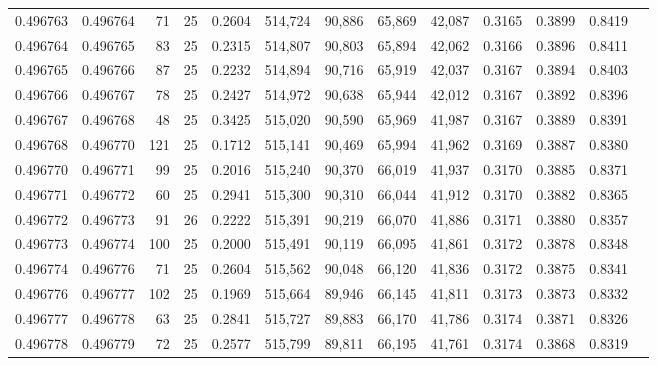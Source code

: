\begin{tabular}{rrrrrrrrrrrrr}
0.496763 & 0.496764 &    71 &  25 &                                     0.2604 & 514,724 &  90,886 &  65,869 &  42,087 & 0.3165 & 0.3899 & 0.8419 \\
0.496764 & 0.496765 &    83 &  25 &                                     0.2315 & 514,807 &  90,803 &  65,894 &  42,062 & 0.3166 & 0.3896 & 0.8411 \\
0.496765 & 0.496766 &    87 &  25 &                                     0.2232 & 514,894 &  90,716 &  65,919 &  42,037 & 0.3167 & 0.3894 & 0.8403 \\
0.496766 & 0.496767 &    78 &  25 &                                     0.2427 & 514,972 &  90,638 &  65,944 &  42,012 & 0.3167 & 0.3892 & 0.8396 \\
0.496767 & 0.496768 &    48 &  25 &                                     0.3425 & 515,020 &  90,590 &  65,969 &  41,987 & 0.3167 & 0.3889 & 0.8391 \\
0.496768 & 0.496770 &   121 &  25 &                                     0.1712 & 515,141 &  90,469 &  65,994 &  41,962 & 0.3169 & 0.3887 & 0.8380 \\
0.496770 & 0.496771 &    99 &  25 &                                     0.2016 & 515,240 &  90,370 &  66,019 &  41,937 & 0.3170 & 0.3885 & 0.8371 \\
0.496771 & 0.496772 &    60 &  25 &                                     0.2941 & 515,300 &  90,310 &  66,044 &  41,912 & 0.3170 & 0.3882 & 0.8365 \\
0.496772 & 0.496773 &    91 &  26 &                                     0.2222 & 515,391 &  90,219 &  66,070 &  41,886 & 0.3171 & 0.3880 & 0.8357 \\
0.496773 & 0.496774 &   100 &  25 &                                     0.2000 & 515,491 &  90,119 &  66,095 &  41,861 & 0.3172 & 0.3878 & 0.8348 \\
0.496774 & 0.496776 &    71 &  25 &                                     0.2604 & 515,562 &  90,048 &  66,120 &  41,836 & 0.3172 & 0.3875 & 0.8341 \\
0.496776 & 0.496777 &   102 &  25 &                                     0.1969 & 515,664 &  89,946 &  66,145 &  41,811 & 0.3173 & 0.3873 & 0.8332 \\
0.496777 & 0.496778 &    63 &  25 &                                     0.2841 & 515,727 &  89,883 &  66,170 &  41,786 & 0.3174 & 0.3871 & 0.8326 \\
0.496778 & 0.496779 &    72 &  25 &                                     0.2577 & 515,799 &  89,811 &  66,195 &  41,761 & 0.3174 & 0.3868 & 0.8319 \\

\end{tabular}
